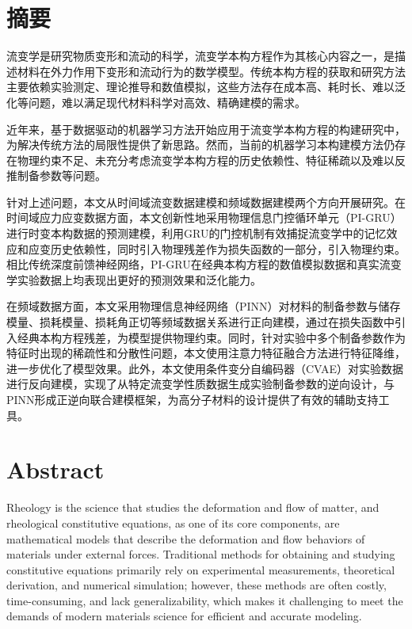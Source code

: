 \chapter{摘\texorpdfstring{\quad}{}要}
流变学是研究物质变形和流动的科学，流变学本构方程作为其核心内容之一，是描述材料在外力作用下变形和流动行为的数学模型。传统本构方程的获取和研究方法主要依赖实验测定、理论推导和数值模拟，这些方法存在成本高、耗时长、难以泛化等问题，难以满足现代材料科学对高效、精确建模的需求。

近年来，基于数据驱动的机器学习方法开始应用于流变学本构方程的构建研究中，为解决传统方法的局限性提供了新思路。然而，当前的机器学习本构建模方法仍存在物理约束不足、未充分考虑流变学本构方程的历史依赖性、特征稀疏以及难以反推制备参数等问题。

针对上述问题，本文从时间域流变数据建模和频域数据建模两个方向开展研究。在时间域应力应变数据方面，本文创新性地采用物理信息门控循环单元（PI-GRU）进行时变本构数据的预测建模，利用GRU的门控机制有效捕捉流变学中的记忆效应和应变历史依赖性，同时引入物理残差作为损失函数的一部分，引入物理约束。相比传统深度前馈神经网络，PI-GRU在经典本构方程的数值模拟数据和真实流变学实验数据上均表现出更好的预测效果和泛化能力。

在频域数据方面，本文采用物理信息神经网络（PINN）对材料的制备参数与储存模量、损耗模量、损耗角正切等频域数据关系进行正向建模，通过在损失函数中引入经典本构方程残差，为模型提供物理约束。同时，针对实验中多个制备参数作为特征时出现的稀疏性和分散性问题，本文使用注意力特征融合方法进行特征降维，进一步优化了模型效果。此外，本文使用条件变分自编码器（CVAE）对实验数据进行反向建模，实现了从特定流变学性质数据生成实验制备参数的逆向设计，与PINN形成正逆向联合建模框架，为高分子材料的设计提供了有效的辅助支持工具。

\chapter{Abstract}
Rheology is the science that studies the deformation and flow of matter, and rheological constitutive equations, as one of its core components, are mathematical models that describe the deformation and flow behaviors of materials under external forces. Traditional methods for obtaining and studying constitutive equations primarily rely on experimental measurements, theoretical derivation, and numerical simulation; however, these methods are often costly, time-consuming, and lack generalizability, which makes it challenging to meet the demands of modern materials science for efficient and accurate modeling.

